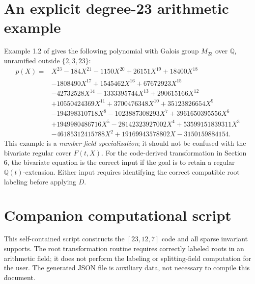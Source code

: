 \documentclass[11pt,letterpaper]{article}
\theoremstyle{definition}
\newcommand{\QQ}{\mathbb{Q}}
\begin{document}
\section{An explicit degree-23 arithmetic example}\label{app:example}
Example 1.2 of \cite{HJLPPZ26} gives the following polynomial with Galois group \(M_{23}\) over \(\QQ\), unramified outside \(\{2,3,23\}\):
{\small
\begin{align*}
p(X)={}&X^{23}-184X^{21}-1150X^{20}+26151X^{19}+18400X^{18}\\
&-1808490X^{17}+1545462X^{16}+67672923X^{15}\\
&-42732528X^{14}-1333395744X^{13}+290615166X^{12}\\
&+10550424369X^{11}+3700476348X^{10}+35123826654X^9\\
&-194398310718X^8-1023887308293X^7+3961650395556X^6\\
&+1949980486716X^5-28142323927002X^4+53599151839311X^3\\
&-46185312415788X^2+19169943578802X-3150159884154.
\end{align*}}
This example is a \emph{number-field specialization}; it should not be confused with the bivariate regular cover \(F(t,X)\). For the code-derived transformation in Section 6, the bivariate equation is the correct input if the goal is to retain a regular \(\QQ(t)\)-extension. Either input requires identifying the correct compatible root labeling before applying \(D\).

\section{Companion computational script}\label{app:code}
This self-contained script constructs the \([23,12,7]\) code and all sparse invariant supports. The root transformation routine requires correctly labeled roots in an arithmetic field; it does not perform the labeling or splitting-field computation for the user. The generated JSON file is auxiliary data, not necessary to compile this document.
\end{document}
